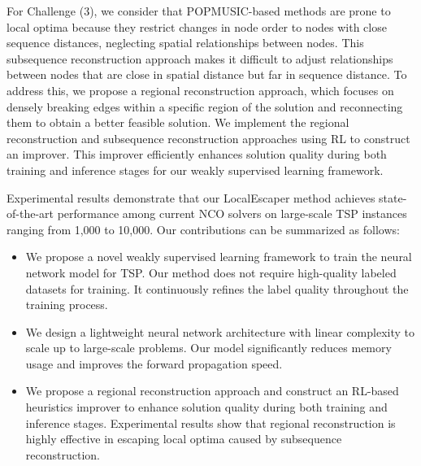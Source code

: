 For Challenge (3), we consider that POPMUSIC-based methods are prone to local optima because they restrict changes in node order to nodes with close sequence distances, neglecting spatial relationships between nodes. This subsequence reconstruction approach makes it difficult to adjust relationships between nodes that are close in spatial distance but far in sequence distance. 
To address this, we propose a regional reconstruction approach, which focuses on densely breaking edges within a specific region of the solution and reconnecting them to obtain a better feasible solution. We implement the regional reconstruction and subsequence reconstruction approaches using RL to construct an improver. This improver efficiently enhances solution quality during both training and inference stages for our weakly supervised learning framework. 

Experimental results demonstrate that our LocalEscaper method achieves state-of-the-art performance among current NCO solvers on large-scale TSP instances ranging from 1,000 to 10,000. Our contributions can be summarized as follows:
\begin{itemize}
\item We propose a novel weakly supervised learning framework to train the neural network model for TSP. Our method does not require high-quality labeled datasets for training. It continuously refines the label quality throughout the training process.
\item We design a lightweight neural network architecture with linear complexity to scale up to large-scale problems. Our model significantly reduces memory usage and improves the forward propagation speed.
\item  We propose a regional reconstruction approach and construct an RL-based heuristics improver to enhance solution quality during both training and inference stages. Experimental results show that regional reconstruction is highly effective in escaping local optima caused by subsequence reconstruction.
\end{itemize}
